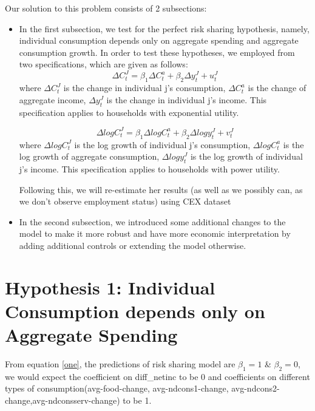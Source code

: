 \documentclass[12pt,a4paper]{article}
\begin{document}
Our solution to this problem consists of 2 subsections:
\begin{itemize}
    \item In the first subsection, we test for the perfect risk sharing hypothesis, namely, individual consumption depends only on aggregate spending and aggregate consumption growth. In order to test these hypotheses, we employed from \citealp{mace1991} two specifications, which are given as follows:
\begin{equation}\label{one}
      \Delta C_t^J =\beta_1 \Delta C_t^a + \beta_2 \Delta y_t^J + u_t^J
\end{equation}
where $\Delta C_t^J$ is the change in individual j's consumption, $\Delta C_t^a$ is the change of aggregate income, $\Delta y_t^J$ is the change in individual j's income. This specification applies to households with exponential utility.


\begin{equation}\label{two}
      \Delta log  C_t^J =\beta_1 \Delta log C_t^a + \beta_2 \Delta log y_t^J + v_t^J
\end{equation}
where   $\Delta log  C_t^J$ is the log growth of individual j's consumption,   $  \Delta log  C_t^a$ is the log growth of aggregate consumption,  $ \Delta log y_t^J$ is the log growth of  individual j's income. This specification applies to households with power utility. 

Following this, we will re-estimate her results (as well as we possibly can, as we don’t observe employment status) using CEX dataset

\item In the second subsection, we introduced some additional changes to the model to make it more robust and have more economic interpretation by adding additional controls or extending the model otherwise.


\end{itemize}





\section{Hypothesis 1: Individual Consumption depends only on Aggregate Spending}
From equation \eqref{one}, the predictions of risk sharing model are $\beta_1=1$ \& $\beta_2=0$, we would expect the coefficient on diff\_netinc to be 0 and coefficients on different types of consumption(avg-food-change, avg-ndcons1-change,  avg-ndcons2-change,avg-ndconsserv-change) to be 1. 
\end{document}
